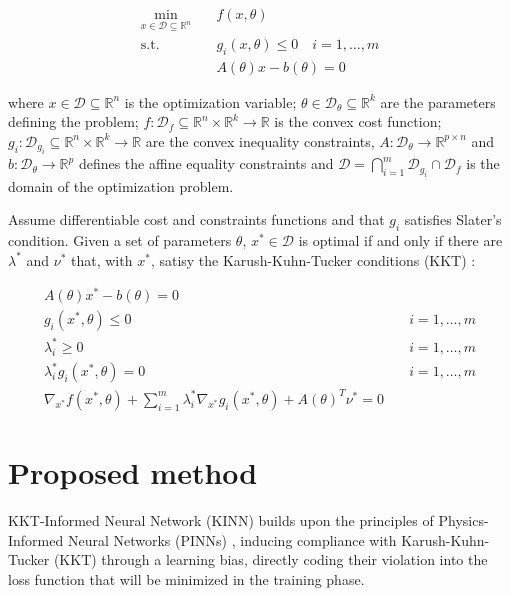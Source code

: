 \documentclass[
]{article}
\begin{document}
\[
\begin{aligned}
\min_{x \in \mathcal{D} \subseteq\mathbb{R}^n} \quad &f(x, {\theta})\\
\textrm{s.t.} \quad & g_i(x, \theta) \leq 0 \quad i = 1, \dots, m \\
& A(\theta) x - b(\theta) = 0
\end{aligned}
\]

where \(x \in \mathcal{D} \subseteq\mathbb{R}^n\) is the optimization
variable; \(\theta \in \mathcal{D}_\theta \subseteq \mathbb{R}^k\) are
the parameters defining the problem;
\(f: \mathcal{D}_f \subseteq\mathbb{R}^n \times \mathbb{R}^k \to \mathbb{R}\)
is the convex cost function;
\(g_i: \mathcal{D}_{g_i} \subseteq\mathbb{R}^n \times \mathbb{R}^k \to \mathbb{R}\)
are the convex inequality constraints,
\(A: \mathcal{D}_\theta \to \mathbb{R}^{p \times n}\) and
\(b: \mathcal{D}_\theta \to \mathbb{R}^{p}\) defines the affine equality
constraints and
\(\mathcal{D} = \bigcap_{i=1}^{m} \mathcal{D}_{g_i} \cap \mathcal{D}_{f}\)
is the domain of the optimization problem.

Assume differentiable cost and constraints functions and that \(g_i\)
satisfies Slater's condition. Given a set of parameters \(\theta\),
\(x^* \in \mathcal{D}\) is optimal if and only if there are
\(\lambda^*\) and \(\nu^*\) that, with \(x^*\), satisy the
Karush-Kuhn-Tucker conditions (KKT)
\autocite{boydConvexOptimization2004}:

\begin{align}
    A(\theta) x^* - b(\theta) = 0&\\
    g_i(x^*, \theta) \leq 0& \quad i=1,\dots, m\\
    \lambda_i^* \geq 0& \quad i=1,\dots, m\\
    \lambda_i^* g_i(x^*, \theta) = 0& \quad i=1,\dots, m\\
    \nabla_{x^*} f(x^*, \theta) + \sum\nolimits_{i=1}^m \lambda^*_i\nabla_{x^*} g_i(x^*, \theta) + A(\theta)^T\nu^* = 0 &
\end{align}

\section{Proposed method}\label{proposed-method}

KKT-Informed Neural Network (KINN) builds upon the principles of
Physics-Informed Neural Networks (PINNs)
\autocite{raissiPhysicsinformedNeuralNetworks2019a}, inducing compliance
with Karush-Kuhn-Tucker (KKT) through a learning bias, directly coding
their violation into the loss function that will be minimized in the
training phase.
\end{document}
